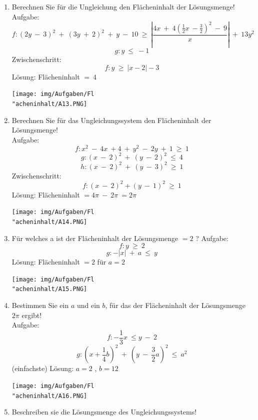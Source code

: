 \begin{enumerate}
\begin{center}
					\end{center}
	\item Berechnen Sie f\"ur die Ungleichung den Fl\"acheninhalt der L\"osungsmenge! \\
				Aufgabe:
					\[f : (2y \ - \ 3)^2 \ + \ (3y \ + \ 2)^2 \ + \ y \ - \ 10 \ \geq \ | \frac {4x \ + \ 4 (\frac 1 2 x \ - \frac 3 2 )^2 \ - \ 9} x | \ + \ 13y^2 \]
					\[g : y \ \leq \ -1\]
				Zwischenschritt:
					\[f : y \ \geq \ |x-2|-3\]
				L\"osung: Fl\"acheninhalt $ = \ 4 $
					\begin{center}
						\texttt{[image: img/Aufgaben/Fl\\"acheninhalt/A13.PNG]}
					\end{center}
	\item Berechnen Sie f\"ur das Ungleichungssystem den Fl\"acheninhalt der L\"osungsmenge! \\
				Aufgabe:
					\[f : x^2 \ - \ 4x \ + 4 \ + \ y^2 \ - \ 2y \ + \ 1 \ \geq \ 1 \]
					\[g : (x \ - \ 2)^2 \ + \ (y \ - \ 2)^2 \ \leq \ 4 \]
					\[h : (x \ - \ 2)^2 \ + \ (y \ - \ 3)^2 \ \geq \ 1 \]
				Zwischenschritt:
					\[f : (x \ - \ 2)^2 + (y \ - \ 1)^2 \ \geq \ 1\]
				L\"osung: Fl\"acheninhalt $ = 4 \pi \ - \ 2 \pi \ = 2 \pi $
					\begin{center}
						\texttt{[image: img/Aufgaben/Fl\\"acheninhalt/A14.PNG]}
					\end{center}
	\item F\"ur welches a ist der Fl\"acheninhalt der L\"osungsmenge $ = 2 $ ?
				Aufgabe:
					\[f : y \ \geq \ 2\]
					\[g : -|x| \ + \ a \ \leq \ y\]
				L\"osung: Fl\"acheninhalt $ = 2 $ f\"ur $ a = 2 $
					\begin{center}
						\texttt{[image: img/Aufgaben/Fl\\"acheninhalt/A15.PNG]}
					\end{center}
	\item Bestimmen Sie ein $a$ und ein $ b $, f\"ur das der Fl\"acheninhalt der L\"osungsmenge $ 2 \pi $ ergibt! \\
				Aufgabe:
					\[f : - \frac 1 3 x \ \leq y \ - \ 2\]
					\[g : (x+ \frac 1 4 b)^2 \ + \ (y \ - \ \frac 3 2 a)^2 \ \leq \ a^2\]
				(einfachste) L\"osung: $ a = 2 $ , $ b = 12 $
					\begin{center}
						\texttt{[image: img/Aufgaben/Fl\\"acheninhalt/A16.PNG]}
					\end{center}
	\item Beschreiben sie die L\"osungsmenge des Ungleichungssystems! \\

\end{enumerate}
